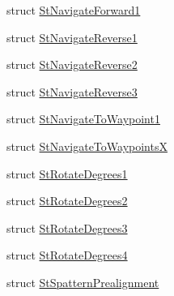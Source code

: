\begin{DoxyCompactItemize}
\item 
struct \hyperlink{structsm__dance__bot__strikes__back_1_1StNavigateForward1}{St\+Navigate\+Forward1}
\item 
struct \hyperlink{structsm__dance__bot__strikes__back_1_1StNavigateReverse1}{St\+Navigate\+Reverse1}
\item 
struct \hyperlink{structsm__dance__bot__strikes__back_1_1StNavigateReverse2}{St\+Navigate\+Reverse2}
\item 
struct \hyperlink{structsm__dance__bot__strikes__back_1_1StNavigateReverse3}{St\+Navigate\+Reverse3}
\item 
struct \hyperlink{structsm__dance__bot__strikes__back_1_1StNavigateToWaypoint1}{St\+Navigate\+To\+Waypoint1}
\item 
struct \hyperlink{structsm__dance__bot__strikes__back_1_1StNavigateToWaypointsX}{St\+Navigate\+To\+WaypointsX}
\item 
struct \hyperlink{structsm__dance__bot__strikes__back_1_1StRotateDegrees1}{St\+Rotate\+Degrees1}
\item 
struct \hyperlink{structsm__dance__bot__strikes__back_1_1StRotateDegrees2}{St\+Rotate\+Degrees2}
\item 
struct \hyperlink{structsm__dance__bot__strikes__back_1_1StRotateDegrees3}{St\+Rotate\+Degrees3}
\item 
struct \hyperlink{structsm__dance__bot__strikes__back_1_1StRotateDegrees4}{St\+Rotate\+Degrees4}
\item 
struct \hyperlink{structsm__dance__bot__strikes__back_1_1StSpatternPrealignment}{St\+Spattern\+Prealignment}
\end{DoxyCompactItemize}
